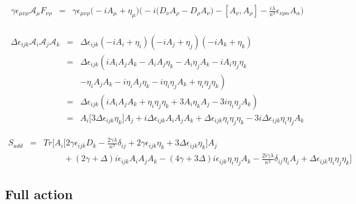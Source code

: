 \documentclass[a4paper,11pt]{article} %
\numberwithin{equation}{section} %
\numberwithin{figure}{section} %
\theoremstyle{plain} %
\theoremstyle{definition} %
\theoremstyle{remark} %
\begin{document}
\begin{eqnarray*}
 \gamma \epsilon_{\mu \nu \rho} \mathcal{A}_\mu F_{\nu \rho} 
                 &=& \gamma \epsilon_{\mu \nu \rho} \Big( -i A_\mu + \eta_\mu \Big) \Bigg( - i \big(D_{\nu} A_{\rho}-D_{\rho} A_{\nu}\big) - [A_{\nu},A_{\rho}] - \frac{i \lambda}{\kappa^{2}} \epsilon_{\nu \rho \alpha} A_{\alpha} \Bigg) \\            
\end{eqnarray*}

\begin{eqnarray*}
 \Delta \epsilon_{ijk} \mathcal{A}_{i} \mathcal{A}_{j} \mathcal{A}_{k} &=& \Delta \epsilon_{ijk} ( -i A_i + \eta_i ) ( -i A_j + \eta_j ) ( -i A_k + \eta_k ) \\
                       &=& \Delta \epsilon_{ijk} \left( i A_i A_j A_k - A_i A_j \eta_k - A_i \eta_j A_k - i A_i \eta_j \eta_k \right. \\
                       && \left. - \eta_i A_j A_k - i \eta_i A_j \eta_k - i \eta_i \eta_j A_k +  \eta_i \eta_j \eta_k  \right) \\
                       &=& \Delta \epsilon_{ijk} \left( i A_i A_j A_k + \eta_i \eta_j \eta_k  + 3 A_i \eta_k A_j - 3 i \eta_i \eta_j A_k \right) \\
                       &=& A_i \big[ 3 \Delta \epsilon_{ijk} \eta_k \big] A_j + i \Delta \epsilon_{ijk} A_i A_j A_k + \Delta \epsilon_{ijk} \eta_{i} \eta_j \eta_k - 3i \Delta \epsilon_{ijk} \eta_i \eta_j A_k
\end{eqnarray*}

\begin{eqnarray*}
 S_{add} &=& Tr \Big[ A_i \Big[ 2 \gamma \epsilon_{ijk} D_k - \frac{2 \gamma \lambda}{\kappa^{2}} \delta_{ij} + 2 \gamma \epsilon_{ijk} \eta_{k} + 3 \Delta \epsilon_{ijk} \eta_k \Big] A_j \\ 
     && \hspace{1cm} + ( 2 \gamma + \Delta ) i \epsilon_{ijk} A_i A_j A_k - ( 4 \gamma + 3 \Delta ) i \epsilon_{ijk} \eta_i \eta_j A_k - \frac{2i \gamma \lambda}{\kappa^2} \delta_{ij} \eta_i A_j + \Delta \epsilon_{ijk} \eta_{i} \eta_j \eta_k \Big]
\end{eqnarray*}



\subsection*{Full action}
\end{document}
